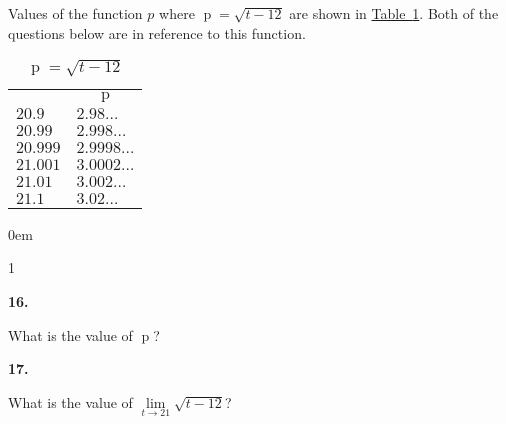 \documentclass[12pt,]{book}
\theoremstyle{plain}
\theoremstyle{definition}
\numberwithin{equation}{section}
\newcommand{\hrulemedium}{\noalign{\hrule height 0.07em}}
\newcommand{\hrulethick} {\noalign{\hrule height 0.11em}}
\newenvironment{exercisegroup}%
{\medskip\noindent}%
{\par\bigskip}%
\newlength{\exercisegroupindent}%
\newlength{\exercisegroupitemwidth}%
\newenvironment{exercisegrouplist}%
{\vspace{-\partopsep}%
\begin{adjustwidth}{\exercisegroupindent}{0em}}%
{\end{adjustwidth}%
\vspace{-\partopsep}%
\vspace{\baselineskip}}%
\newenvironment{exercisegroupbycol}[1]%
{\begin{exercisegrouplist}%
\vspace{-\multicolsep}%
\begin{multicols}{#1}%
\setlength{\parindent}{0em}%
\setlength{\exercisegroupitemwidth}{\linewidth}}%
{\end{multicols}%
\vspace{-\multicolsep}%
\end{exercisegrouplist}}%
\newenvironment{exercisegroupitem}[1]%
{\begin{minipage}[t]{\exercisegroupitemwidth}
\vspace{0pt}%
{\bfseries#1}%
\rule{0pt}{\baselineskip}}{\strut%
\end{minipage}%
\hspace{\columnsep}}%
\providecommand\phantomsection{}
\newcommand{\fe}[2]{\mathop{{#1}{\left(#2\right)}}}
\begin{document}
\begin{exercisegroup}%
Values of the function \(p\) where \(\fe{p}{t}=\sqrt{t-12}\) are shown in \hyperref[table-square-root-values]{Table~\ref*{table-square-root-values}}. Both of the questions below are in reference to this function.%
\begin{table}
\centering
\caption{\(\fe{p}{t}=\sqrt{t-12}\)\label{table-square-root-values}}
\begin{tabular}{ll}\hrulethick
\multicolumn{1}{c}{\(t\)}&\multicolumn{1}{c}{\(\fe{p}{t}\)}\\\hrulemedium
\(20.9\)&\(2.98\ldots\)\\
\(20.99\)&\(2.998\ldots\)\\
\(20.999\)&\(2.9998\ldots\)\\
\(21.001\)&\(3.0002\ldots\)\\
\(21.01\)&\(3.002\ldots\)\\
\(21.1\)&\(3.02\ldots\)
\end{tabular}
\end{table}
\begin{exercisegroupbycol}{1}%
\begin{exercisegroupitem}{16. }\phantomsection\hypertarget{exercise-45}{\null}
What is the value of \(\fe{p}{21}\)?%
\end{exercisegroupitem}%
\par%
\begin{exercisegroupitem}{17. }\phantomsection\hypertarget{exercise-46}{\null}
What is the value of \(\lim\limits_{t\to21}\sqrt{t-12}\)?%
\end{exercisegroupitem}%
\par%
\end{exercisegroupbycol}%
\end{exercisegroup}%
\end{document}
